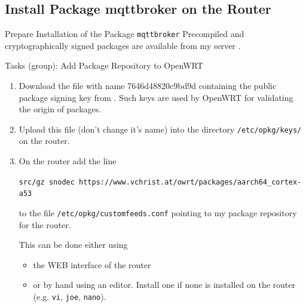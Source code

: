 ﻿\subsection{Install Package \alert{mqttbroker} on the Router}

\begin{frame}[fragile]{Prepare Installation of the Package \alert{\texttt{mqttbroker}}}
{\href{https://github.com/SNodeC/mqttbroker}{}}
\alert{Precompiled and cryptographically signed packages} are available from \alert{my server} \href{https://www.vchrist.at/owrt}{}.
\begin{exampleblock}{Tasks (group): Add Package Repository to OpenWRT}
\begin{enumerate}
  \item \alert{Download} the file with name \alert{7646d48820c9bd9d} containing the \alert{public} package signing \alert{key} from \href{https://www.vchrist.at/owrt}{}. Such \alert{keys} are used by OpenWRT for \alert{validating} the \alert{origin} of packages.
  \item \alert{Upload} this file (\alert{don't change it's name}) into the directory \alert{\texttt{/etc/opkg/keys/}} on the router.
  \item On the router \alert{add} the line\\
  \begin{alertblock}{}
  \texttt{src/gz snodec https://www.vchrist.at/owrt/packages/aarch64\_cortex-a53}
  \end{alertblock}
    to the file \alert{\texttt{/etc/opkg/customfeeds.conf}} pointing to my \alert{package repository} for the router.
  This can be done either using
  \begin{itemize}
    \item the \alert{WEB interface} of the router
    \item or \alert{by hand} using an \alert{editor}. Install one if none is installed on the router (e.g. \texttt{vi}, \texttt{joe}, \texttt{nano}).
  \end{itemize}
\end{enumerate}
\end{exampleblock}
\end{frame}
